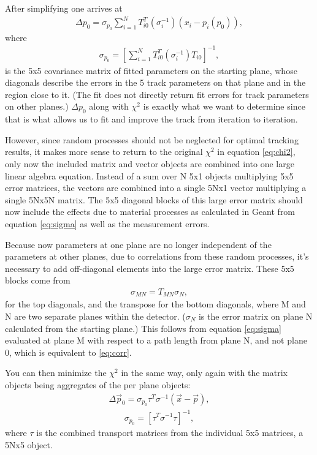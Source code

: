     After simplifying one arrives at 
        \begin{align} \label{eq:deltap}
            \Delta p_{0} = \sigma_{p_{0}} \sum_{i=1}^{N} T^{T}_{i0}(\sigma_{i}^{-1})(x_{i} - p_{i}(p_{0})),
        \end{align}
    where
        \begin{align} \label{eq:cov}
            \sigma_{p_{0}} = [\sum_{i=1}^{N} T^{T}_{i0} (\sigma_{i}^{-1}) T_{i0} ]^{-1},
        \end{align}
    is the 5x5 covariance matrix of fitted parameters on the starting plane, whose diagonals describe the errors in the 5 track parameters on that plane and in the region close to it. (The fit does not directly return fit errors for track parameters on other planes.) $\Delta p_{0}$ along with $\chi^2$ is exactly what we want to determine since that is what allows us to fit and improve the track from iteration to iteration.

    However, since random processes should not be neglected for optimal tracking results, it makes more sense to return to the original $\chi^2$ in equation \ref{eq:chi2}, only now the included matrix and vector objects are combined into one large linear algebra equation. Instead of a sum over N 5x1 objects multiplying 5x5 error matrices, the vectors are combined into a single 5Nx1 vector multiplying a single 5Nx5N matrix. The 5x5 diagonal blocks of this large error matrix should now include the effects due to material processes as calculated in Geant from equation \ref{eq:sigma} as well as the measurement errors. 

    Because now parameters at one plane are no longer independent of the parameters at other planes, due to correlations from these random processes, it's necessary to add off-diagonal elements into the large error matrix. These 5x5 blocks come from 
        \begin{align} \label{eq:corr}
            \sigma_{MN} = T_{MN} \sigma_{N}, 
        \end{align}
    for the top diagonals, and the transpose for the bottom diagonals, where M and N are two separate planes within the detector. ($\sigma_{N}$ is the error matrix on plane N calculated from the starting plane.) This follows from equation \ref{eq:sigma} evaluated at plane M with respect to a path length from plane N, and not plane 0, which is equivalent to \ref{eq:corr}. 

    You can then minimize the $\chi^{2}$ in the same way, only again with the matrix objects being aggregates of the per plane objects:
        \begin{align} \label{eq:deltafull}
            \Delta \vec{p}_{0} = \sigma_{p_{0}} \tau^{T}\sigma^{-1}(\vec{x}-\vec{p}),
        \end{align}
        \begin{align} \label{eq:covfull}
            \sigma_{p_{0}} = [\tau^{T} \sigma^{-1} \tau ]^{-1},
        \end{align}
    where $\tau$ is the combined transport matrices from the individual 5x5 matrices, a 5Nx5 object.

